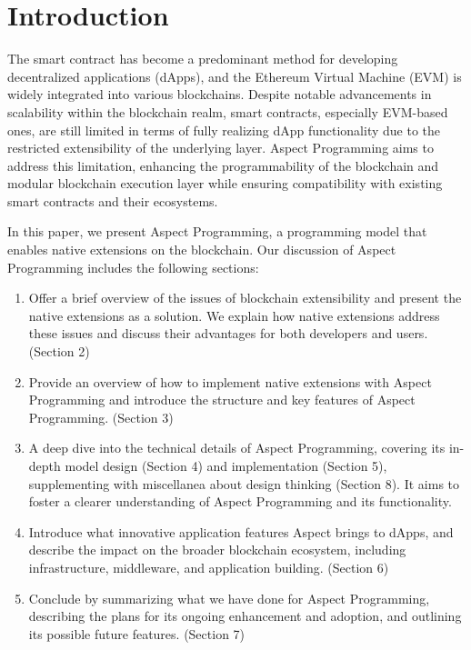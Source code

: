 
\section{Introduction}

The smart contract has become a predominant method for developing decentralized applications (dApps), and the Ethereum Virtual Machine (EVM) is widely integrated into various blockchains. Despite notable advancements in scalability within the blockchain realm, smart contracts, especially EVM-based ones, are still limited in terms of fully realizing dApp functionality due to the restricted extensibility of the underlying layer. Aspect Programming aims to address this limitation, enhancing the programmability of the blockchain and modular blockchain execution layer while ensuring compatibility with existing smart contracts and their ecosystems.

In this paper, we present Aspect Programming, a programming model that enables native extensions on the blockchain. Our discussion of Aspect Programming includes the following sections:

\begin{enumerate}
  \item Offer a brief overview of the issues of blockchain extensibility and present the native extensions as a solution. We explain how native extensions address these issues and discuss their advantages for both developers and users. (Section 2)
  \item Provide an overview of how to implement native extensions with Aspect Programming and introduce the structure and key features of Aspect Programming. (Section 3)
  \item A deep dive into the technical details of Aspect Programming, covering its in-depth model design (Section 4) and implementation (Section 5), supplementing with miscellanea about design thinking (Section 8). It aims to foster a clearer understanding of Aspect Programming and its functionality.
  \item Introduce what innovative application features Aspect brings to dApps, and describe the impact on the broader blockchain ecosystem, including infrastructure, middleware, and application building. (Section 6)
  \item Conclude by summarizing what we have done for Aspect Programming, describing the plans for its ongoing enhancement and adoption, and outlining its possible future features. (Section 7)
\end{enumerate}
